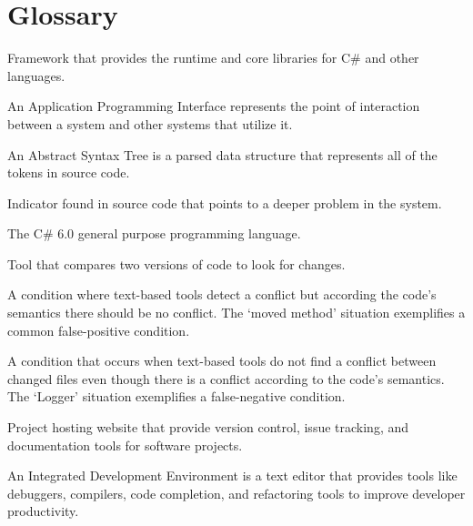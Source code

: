 \documentclass[draftclsnofoot,onecolumn]{IEEEtran}
\begin{document}
\section{Glossary}%

\begin{description} 

\item[.NET:] Framework that provides the runtime and core libraries for C\# and other languages.

\item[API:] An Application Programming Interface represents the point of interaction between a system and other systems that utilize it.

\item[AST:] An Abstract Syntax Tree is a parsed data structure that represents all of the tokens in source code.

\item[Code Smell:] Indicator found in source code that points to a deeper problem in the system.

\item[C\#:] The C\# 6.0 general purpose programming language.

\item[Diff:] Tool that compares two versions of code to look for changes.

\item[False-Positive:] A condition where text-based tools  detect a conflict but according the code's semantics there should be no conflict. The `moved method' situation exemplifies a common false-positive condition.

\item[False-Negative:] A condition that occurs when text-based tools do not find a conflict between changed files even though there is a conflict according to the code's semantics. The `Logger' situation exemplifies a false-negative condition.

\item[GitHub:] Project hosting website that provide version control, issue tracking, and documentation tools for software projects.

\item[IDE:] An Integrated Development Environment is a text editor that provides tools like debuggers, compilers, code completion, and refactoring tools to improve developer productivity.


\end{description}
\end{document}
